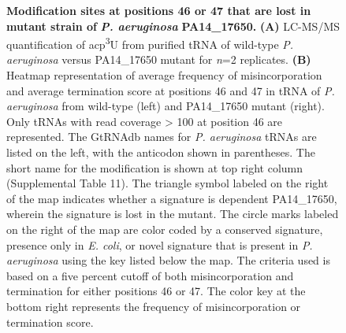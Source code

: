 \documentclass[times, twoside]{zHenriquesLab-StyleBioRxiv}
\begin{document}
\begin{figure} [h]
    \caption{\textbf{Modification sites at positions 46 or 47 that are lost in mutant strain of }\textit{\textbf{P. aeruginosa }}\textbf{PA14\_17650.} \textbf{(A) }LC-MS/MS quantification of acp\textsuperscript{3}U from purified tRNA of wild-type \textit{P. aeruginosa} versus PA14\_17650 mutant for \textit{n}=2 replicates.\textbf{ (B) }Heatmap representation of average frequency of misincorporation and average termination score at positions 46 and 47 in tRNA of \textit{P. aeruginosa }from wild-type (left) and PA14\_17650 mutant (right). Only tRNAs with read coverage > 100 at position 46 are represented. The GtRNAdb names for \textit{P. aeruginosa} tRNAs are listed on the left, with the anticodon shown in parentheses. The short name for the modification is shown at top right column (Supplemental Table 11). The triangle symbol labeled on the right of the map indicates whether a signature is dependent PA14\_17650, wherein the signature is lost in the mutant. The circle marks labeled on the right of the map are color coded by a conserved signature, presence only in \textit{E. coli}, or novel signature that is present in \textit{P. aeruginosa} using the key listed below the map. The criteria used is based on a five percent cutoff of both misincorporation and termination for either positions 46 or 47. The color key at the bottom right represents the frequency of misincorporation or termination score.
}
    \label{fig:enter-label}
\end{figure}
\end{document}
